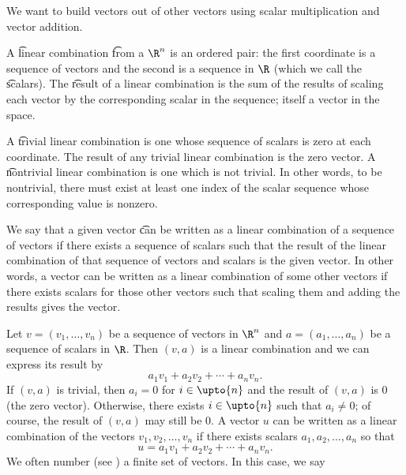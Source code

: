 

We want to build vectors out of other vectors using scalar multiplication and vector addition.


A \t{linear combination} \t{from} a $\R^n$ is an ordered pair: the first coordinate is a sequence of vectors and the second is a sequence in $\R$ (which we call the \t{scalars}).
The \t{result} of a linear combination is the sum of the results of scaling each vector by the corresponding scalar in the sequence; itself a vector in the space.

A \t{trivial linear combination} is one whose sequence of scalars is zero at each coordinate.
The result of any trivial linear combination is the zero vector.
A \t{nontrivial linear combination} is one which is not trivial.
In other words, to be nontrivial, there must exist at least one index of the scalar sequence whose corresponding value is nonzero.

We say that a given vector \t{can be written as a linear combination of} a sequence of vectors if there exists a sequence of scalars such that the result of the linear combination of that sequence of vectors and scalars is the given vector.
In other words, a vector can be written as a linear combination of some other vectors if there exists scalars for those other vectors such that scaling them and adding the results gives the vector.


Let $v = (v_1, \dots, v_n)$ be a sequence of vectors in $\R^n$ and
$a = (a_1, \dots, a_n)$ be a sequence of scalars in $\R$.
Then $(v, a)$ is a linear combination and we can express its result by
  \[
a_1v_1 + a_2v_2 + \cdots + a_n v_n.
  \]
If $(v,a)$ is trivial, then $a_i = 0$ for $i \in \upto{n}$ and the result of $(v, a)$ is $0$ (the zero vector).
Otherwise, there exists $i \in \upto{n}$ such that $a_i \neq 0$; of course, the result of $(v, a)$ may still be $0$.
A vector $u$ can be written as a linear combination of the vectors $v_1, v_2, \dots, v_n$ if there exists scalars $a_1, a_2, \dots, a_n$ so that
    \[
u = a_1v_1 + a_2v_2 + \cdots + a_nv_n.
    \]
We often number (see ) a finite set of vectors.
In this case, we say 


